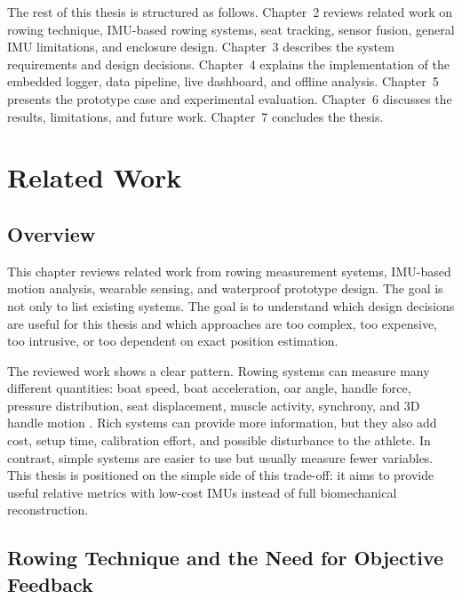 The rest of this thesis is structured as follows. Chapter~2 reviews related work on rowing technique, IMU-based rowing systems, seat tracking, sensor fusion, general IMU limitations, and enclosure design. Chapter~3 describes the system requirements and design decisions. Chapter~4 explains the implementation of the embedded logger, data pipeline, live dashboard, and offline analysis. Chapter~5 presents the prototype case and experimental evaluation. Chapter~6 discusses the results, limitations, and future work. Chapter~7 concludes the thesis.


\chapter{Related Work} %

\section{Overview}

This chapter reviews related work from rowing measurement systems, IMU-based motion analysis, wearable sensing, and waterproof prototype design. The goal is not only to list existing systems. The goal is to understand which design decisions are useful for this thesis and which approaches are too complex, too expensive, too intrusive, or too dependent on exact position estimation.

The reviewed work shows a clear pattern. Rowing systems can measure many different quantities: boat speed, boat acceleration, oar angle, handle force, pressure distribution, seat displacement, muscle activity, synchrony, and 3D handle motion \cite{llosa_remote_2009,avvenuti_mars_2013,cloud_adaptive_2019,hohmuth_wireless_2023,rodriguez_mendoza_wearable_2024}. Rich systems can provide more information, but they also add cost, setup time, calibration effort, and possible disturbance to the athlete. In contrast, simple systems are easier to use but usually measure fewer variables. This thesis is positioned on the simple side of this trade-off: it aims to provide useful relative metrics with low-cost IMUs instead of full biomechanical reconstruction.

\section{Rowing Technique and the Need for Objective Feedback}

